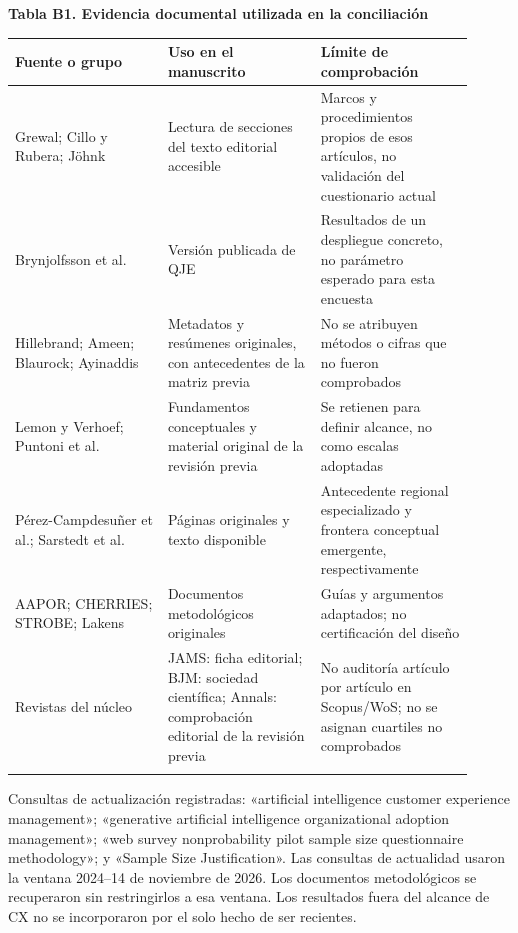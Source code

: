 \documentclass[12pt,letterpaper]{article}
\begin{document}
\noindent \textbf{Tabla B1. Evidencia documental utilizada en la conciliación}\par\nopagebreak
\begingroup\small{}\setlength{\tabcolsep}{4pt}\begin{longtable}{>{\raggedright\arraybackslash}p{0.303\linewidth}>{\raggedright\arraybackslash}p{0.303\linewidth}>{\raggedright\arraybackslash}p{0.303\linewidth}}
\toprule
\textbf{Fuente o grupo} & \textbf{Uso en el manuscrito} & \textbf{Límite de comprobación} \\ \midrule\endhead
Grewal; Cillo y Rubera; Jöhnk & Lectura de secciones del texto editorial accesible & Marcos y procedimientos propios de esos artículos, no validación del cuestionario actual \\ \addlinespace[5pt]
Brynjolfsson et al. & Versión publicada de QJE & Resultados de un despliegue concreto, no parámetro esperado para esta encuesta \\ \addlinespace[5pt]
Hillebrand; Ameen; Blaurock; Ayinaddis & Metadatos y resúmenes originales, con antecedentes de la matriz previa & No se atribuyen métodos o cifras que no fueron comprobados \\ \addlinespace[5pt]
Lemon y Verhoef; Puntoni et al. & Fundamentos conceptuales y material original de la revisión previa & Se retienen para definir alcance, no como escalas adoptadas \\ \addlinespace[5pt]
Pérez-Campdesuñer et al.; Sarstedt et al. & Páginas originales y texto disponible & Antecedente regional especializado y frontera conceptual emergente, respectivamente \\ \addlinespace[5pt]
AAPOR; CHERRIES; STROBE; Lakens & Documentos metodológicos originales & Guías y argumentos adaptados; no certificación del diseño \\ \addlinespace[5pt]
Revistas del núcleo & JAMS: ficha editorial; BJM: sociedad científica; Annals: comprobación editorial de la revisión previa & No auditoría artículo por artículo en Scopus/WoS; no se asignan cuartiles no comprobados \\ \addlinespace[5pt]
\bottomrule\end{longtable}\endgroup
Consultas de actualización registradas: «artificial intelligence customer experience management»; «generative artificial intelligence organizational adoption management»; «web survey nonprobability pilot sample size questionnaire methodology»; y «Sample Size Justification». Las consultas de actualidad usaron la ventana 2024--14 de noviembre de 2026. Los documentos metodológicos se recuperaron sin restringirlos a esa ventana. Los resultados fuera del alcance de CX no se incorporaron por el solo hecho de ser recientes.
\end{document}
